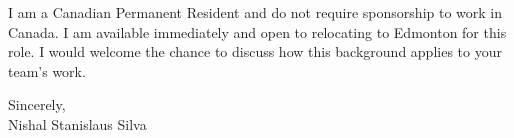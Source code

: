 \documentclass[11pt]{article}
\begin{document}
\vspace{0.8em}
\noindent I am a Canadian Permanent Resident and do not require sponsorship to work in Canada. I am available immediately and open to relocating to Edmonton for this role. I would welcome the chance to discuss how this background applies to your team's work.

\vspace{1.2em}
\noindent Sincerely, \\
Nishal Stanislaus Silva
\end{document}
